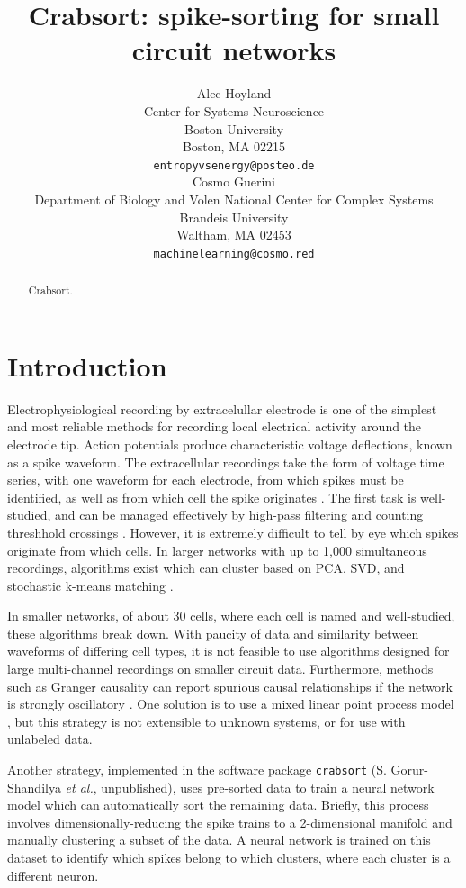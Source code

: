 \documentclass{article}
\title{Crabsort: spike-sorting for small circuit networks}
\author{%
  Alec Hoyland \\
  Center for Systems Neuroscience \\
  Boston University \\
  Boston, MA 02215 \\
  \texttt{entropyvsenergy@posteo.de} \\
  \And
  Cosmo Guerini \\
  Department of Biology and Volen National Center for Complex Systems \\
  Brandeis University \\
  Waltham, MA 02453 \\
  \texttt{machinelearning@cosmo.red}
}
\begin{document}
\maketitle

\begin{abstract}
  Crabsort.
\end{abstract}

\section{Introduction}

Electrophysiological recording by extracelullar electrode is one of the simplest and most reliable
methods for recording local electrical activity around the electrode tip.
Action potentials produce characteristic voltage deflections, known as a spike waveform.
The extracellular recordings take the form of voltage time series, with one waveform for each electrode,
from which spikes must be identified, as well as from which cell the spike originates \autocite{quirogaSpikeSorting2012}.
The first task is well-studied, and can be managed effectively by high-pass filtering and counting threshhold crossings \autocite{rossantSpikeSortingLarge2016, quirogaSpikeSorting2012}.
However, it is extremely difficult to tell by eye which spikes originate from which cells.
In larger networks with up to 1,000 simultaneous recordings, algorithms exist which can cluster
based on PCA, SVD, and stochastic k-means matching \autocite{pachitariuKilosortRealtimeSpikesorting2016, rossantSpikeSortingLarge2016}.

In smaller networks, of about 30 cells, where each cell is named and well-studied,
these algorithms break down. With paucity of data and similarity between waveforms of differing cell types,
it is not feasible to use algorithms designed for large multi-channel recordings on smaller circuit data.
Furthermore, methods such as Granger causality can report spurious causal relationships
if the network is strongly oscillatory \autocite{kisperskyFunctionalConnectivityRhythmic2011}.
One solution is to use a mixed linear point process model \autocite{gerhardSuccessfulReconstructionPhysiological2013a},
but this strategy is not extensible to unknown systems, or for use with unlabeled data.

Another strategy, implemented in the software package \texttt{crabsort} (S. Gorur-Shandilya \textit{et al.}, unpublished),
uses pre-sorted data to train a neural network model which can automatically sort the remaining data.
Briefly, this process involves dimensionally-reducing the spike trains to a 2-dimensional manifold
and manually clustering a subset of the data.
A neural network is trained on this dataset to identify which spikes belong to which clusters,
where each cluster is a different neuron.
\end{document}
